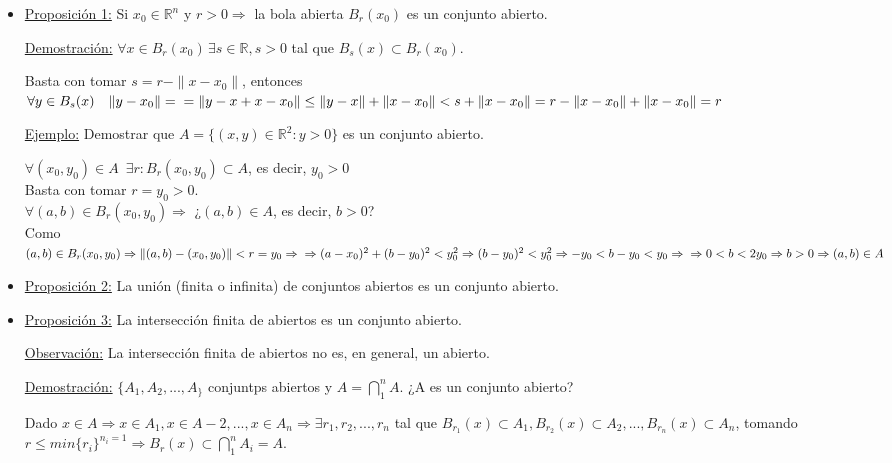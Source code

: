 \documentclass[12pt, titlepage]{article}
\newcommand{\R}{\mathbb{R}}
\newcommand{\spac}{\, \, \,}
\begin{document}
\begin{itemize}

\item \underline{Proposición 1:} Si $x_0 \in \mathbb{R}^n$ y $r>0 \Rightarrow$ la bola abierta $B_r(x_0)$ es un conjunto abierto.

\quad\underline{Demostración:} $\forall x \in B_r(x_0) \, \exists s \in \R , s>0$ tal que $B_s(x) \subset B_r(x_0)$.

Basta con tomar $s = r - \|x-x_0\|$, entonces $\forall y \in B_s(x) \quad \|y - x_0\| = \\
 = \|y -x +x -x_0\| \leq \|y-x\| + \|x - x_0\| < s + \|x - x_0\| = r - \|x - x_0\| + \|x - x_0\| = r$
\vspace{2mm}

\quad\underline{Ejemplo:} Demostrar que $A = \{ (x, y) \in \R^2 : y>0\}$ es un conjunto abierto.

$\forall (x_0, y_0) \in A \spac \exists r : B_r(x_0, y_0) \subset A$, es decir, $y_0 > 0$\\
Basta con tomar $r = y_0 > 0$.\\
$\forall (a, b) \in B_r(x_0, y_0) \Rightarrow$ ¿$(a, b) \in A$, es decir, $b>0$?\\
Como $ (a, b) \in B_r(x_0, y_0) \Rightarrow \|(a, b) - (x_0, y_0)\| < r = y_0 \Rightarrow \\
\Rightarrow (a - x_0)^2 + (b - y_0)^2 < y_0^2 \Rightarrow (b - y_0)^2 < y_0 ^2 \Rightarrow -y_0 < b-y_0 < y_0 \Rightarrow \\
 \Rightarrow 0< b < 2 y_0 \Rightarrow b > 0 \Rightarrow (a, b) \in A$

\item \underline{Proposición 2:} La unión (finita o infinita) de conjuntos abiertos es un conjunto abierto.

\item \underline{Proposición 3:} La intersección finita de abiertos es un conjunto abierto.\vspace{1mm}

\noindent *\underline{Observación:} La intersección finita de abiertos no es, en general, un abierto.

\underline{Demostración:} $\{A_1, A_2,..., A_\}$ conjuntps abiertos y $A = \displaystyle \bigcap_{1}^n A$.  ¿A es un conjunto abierto? 

Dado $x \in A \Rightarrow x \in A_1, x \in A-2,..., x \in A_n \Rightarrow \exists r_1, r_2,..., r_n$ tal que $ B_{r_1}(x) \subset  A_1, B_{r_2}(x) \subset A_2,..., B_{r_n}(x) \subset A_n$, tomando $r \leq min \{r_i\}^{n_i=1} \Rightarrow B_r(x) \subset \displaystyle \bigcap_1^n A_i = A$.

\end{itemize}
\end{document}
